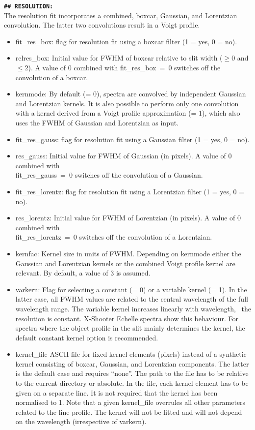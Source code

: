{\bf\large\tt\#\# RESOLUTION:}\\[0.5cm]
The resolution fit incorporates a combined, boxcar, Gaussian, and
Lorentzian convolution. The latter two convolutions result in a Voigt profile.
\begin{itemize}
\item {\sc fit\_res\_box}: flag for resolution fit using a boxcar filter
(1 = yes, 0 = no).
\item {\sc relres\_box}: Initial value for FWHM of boxcar relative to slit
width ($\geq 0$ and $\leq 2$). A value of 0 combined with
{\sc fit\_res\_box}~=~0 switches off the convolution of a boxcar.
\item {\sc kernmode}: By default (= 0), spectra are convolved by independent
Gaussian and Lorentzian kernels. It is also possible to perform only one
convolution with a kernel derived from a Voigt profile approximation (= 1),
which also uses the FWHM of Gaussian and Lorentzian as input.
\item {\sc fit\_res\_gauss}: flag for resolution fit using a Gaussian filter
(1 = yes, 0 = no).
\item {\sc res\_gauss}: Initial value for FWHM of Gaussian (in pixels). A value
of 0 combined with \\ {\sc fit\_res\_gauss}~=~0 switches off the convolution of
a Gaussian.
\item {\sc fit\_res\_lorentz}: flag for resolution fit using a Lorentzian
filter (1 = yes, 0 = no).
\item {\sc res\_lorentz}: Initial value for FWHM of Lorentzian (in pixels). A
value of 0 combined with \\ {\sc fit\_res\_lorentz}~=~0 switches off the
convolution of a Lorentzian.
\item {\sc kernfac}: Kernel size in units of FWHM. Depending on
{\sc kernmode} either the Gaussian and Lorentzian kernels or the combined
Voigt profile kernel are relevant. By default, a value of 3 is assumed.
\item {\sc varkern}: Flag for selecting a constant (= 0) or a variable kernel
(= 1). In the latter case, all FWHM values are related to the central
wavelength of the full wavelength range. The variable kernel increases linearly
with wavelength, \ie\ the resolution is constant. X-Shooter Echelle spectra
show this behaviour. For spectra where the object profile in the slit mainly
determines the kernel, the default constant kernel option is recommended.
\item {\sc kernel\_file} ASCII file for fixed kernel elements (pixels) instead
of a synthetic kernel consisting of boxcar, Gaussian, and Lorentzian
components. The latter is the default case and requires ``none''. The path to
the file has to be relative to the current directory or absolute. In the file, each
kernel element has to be given on a separate line. It is not required that the
kernel has been normalised to 1. Note that a given {\sc kernel\_file} overrules
all other parameters related to the line profile. The kernel will not be
fitted and will not depend on the wavelength (irrespective of {\sc varkern}).
\end{itemize}

